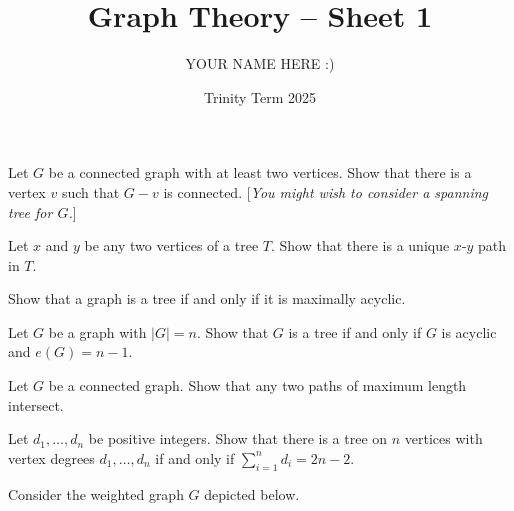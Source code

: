\documentclass[answers]{exam}
\title{Graph Theory -- Sheet 1}
\author{YOUR NAME HERE :)}
\date{Trinity Term 2025}
\begin{document}
\maketitle
\begin{questions}

\question%
Let $G$ be a connected graph with at least two vertices. Show that there is a vertex $v$ such that $G-v$ is connected. [\emph{You might wish to consider a spanning tree for $G$.}]



\question%
Let $x$ and $y$ be any two vertices of a tree $T$. Show that there is a unique $x$-$y$ path in $T$.



\question%
Show that a graph is a tree if and only if it is maximally acyclic.



\question%
Let $G$ be a graph with $|G|=n$. Show that $G$ is a tree if and only if $G$ is acyclic and $e(G)=n-1$.



\question%
Let $G$ be a connected graph. Show that any two paths of maximum length intersect.



\question%
Let $d_{1}, \ldots, d_{n}$ be positive integers. Show that there is a tree on $n$ vertices with vertex degrees $d_{1}, \ldots, d_{n}$ if and only if $\sum_{i=1}^{n} d_{i}=2 n-2$.



\question%
Consider the weighted graph $G$ depicted below.
\begin{center}\end{center}
\begin{parts}

\end{parts}
\end{questions}
\end{document}
